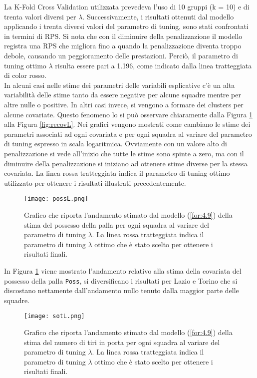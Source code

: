 La K-Fold Cross Validation utilizzata prevedeva l'uso di 10 gruppi (k = 10) e di trenta valori diversi per $\lambda$. Successivamente, i risultati ottenuti dal modello applicando i trenta diversi valori del parametro di tuning, sono stati confrontati in termini di RPS. Si nota che con il diminuire della penalizzazione il modello registra una RPS che migliora fino a quando la penalizzazione diventa troppo debole, causando un peggioramento delle prestazioni. Perciò, il parametro di tuning ottimo $\lambda$ risulta essere pari a 1.196, come indicato dalla linea tratteggiata di color rosso.\\
In alcuni casi nelle stime dei parametri delle variabili esplicative c'è un alta variabilità delle stime tanto da essere negative per alcune squadre mentre per altre nulle o positive. In altri casi invece, si vengono a formare dei clusters per alcune covariate. Questo fenomeno lo si può osservare chiaramente dalla Figura \ref{fig:possL} alla Figura \ref{fig:recovL}. Nei grafici vengono mostrati come cambiano le stime dei parametri associati ad ogni covariata e per ogni squadra al variare del parametro di tuning espresso in scala logaritmica. Ovviamente con un valore alto di penalizzazione si vede all'inizio che tutte le stime sono spinte a zero, ma con il diminuire della penalizzazione si iniziano ad ottenere stime diverse per la stessa covariata. La linea rossa tratteggiata indica il parametro di tuning ottimo utilizzato per ottenere i risultati illustrati precedentemente.
\begin{figure}[htbp]
	\begin{center}
		\texttt{[image: possL.png]}
		\caption{Grafico che riporta l'andamento stimato dal modello (\ref{for:4.9}) della stima del possesso della palla per ogni squadra al variare del parametro di tuning $\lambda$. La linea rossa tratteggiata indica il parametro di tuning $\lambda$ ottimo che è stato scelto per ottenere i risultati finali.} \label{fig:possL}
	\end{center}
\end{figure}

In Figura \ref{fig:possL} viene mostrato l'andamento relativo alla stima della covariata del possesso della palla \texttt{Poss}, si diversificano i risultati per Lazio e Torino che si discostano nettamente dall'andamento nullo tenuto dalla maggior parte delle squadre.

\begin{figure}[htbp]
	\begin{center}
		\texttt{[image: sotL.png]}
		\caption{Grafico che riporta l'andamento stimato dal modello (\ref{for:4.9}) della stima del numero di tiri in porta per ogni squadra al variare del parametro di tuning $\lambda$. La linea rossa tratteggiata indica il parametro di tuning $\lambda$ ottimo che è stato scelto per ottenere i risultati finali.} \label{fig:sotL}
	\end{center}
\end{figure}

